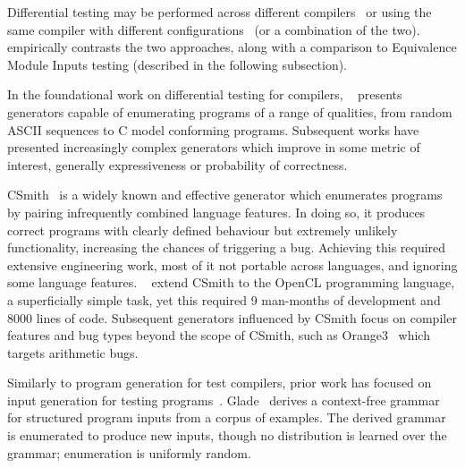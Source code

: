 Differential testing may be performed across different compilers~\cite{Chen2016b,Lidbury2015a} or using the same compiler with different configurations~\cite{Kyle2015b,Paka2011} (or a combination of the two). \citeauthor{Chen2014a}~\cite{Chen2014a} empirically contrasts the two approaches, along with a comparison to Equivalence Module Inputs testing (described in the following subsection).

In the foundational work on differential testing for compilers, \citeauthor{McKeeman1998}~\cite{McKeeman1998} presents generators capable of enumerating programs of a range of qualities, from random ASCII sequences to C model conforming programs. Subsequent works have presented increasingly complex generators which improve in some metric of interest, generally expressiveness or probability of correctness.

CSmith~\cite{Yang2011} is a widely known and effective generator which enumerates programs by pairing infrequently combined language features. In doing so, it produces correct programs with clearly defined behaviour but extremely unlikely functionality, increasing the chances of triggering a bug. Achieving this required extensive engineering work, most of it not portable across languages, and ignoring some language features.
\citeauthor{Lidbury2015a}~\cite{Lidbury2015a} extend CSmith to the OpenCL programming language, a superficially simple task, yet this required 9 man-months of development and 8000 lines of code.
Subsequent generators influenced by CSmith focus on compiler features and bug types beyond the scope of CSmith, such as Orange3~\cite{Nagai2013} which targets arithmetic bugs.

Similarly to program generation for test compilers, prior work has focused on input generation for testing programs~\cite{Godefroid2005,Claessen2015,Duregard2012,Fetscher1998,Runciman2008}. Glade~\cite{Bastani2017} derives a context-free grammar for structured program inputs from a corpus of examples. The derived grammar is enumerated to produce new inputs, though no distribution is learned over the grammar; enumeration is uniformly random.


